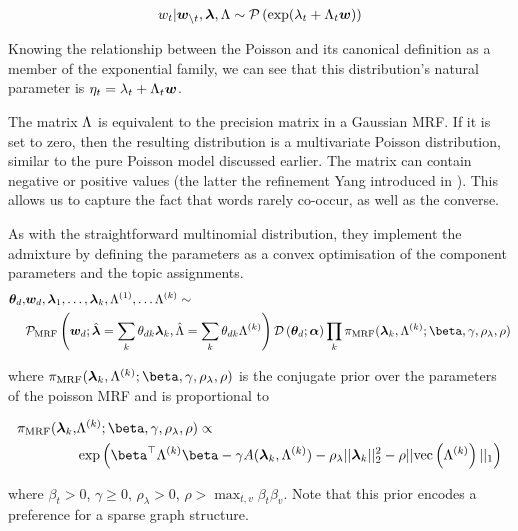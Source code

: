 \begin{align}
w_t | \bm w_{\setminus t}, \bm \lambda, \Lambda  \sim \mathcal{P} \left( {\exp(\lambda_t + \Lambda_t \bm w)} \right)
\end{align}

Knowing the relationship between the Poisson and its canonical definition as a member of the exponential family, we can see that this distribution's natural parameter is $\eta_t = \lambda_t + \Lambda_t \bm w$. 

The matrix $\Lambda$ is equivalent to the precision matrix in a Gaussian MRF. If it is set to zero, then the resulting distribution is a multivariate Poisson distribution, similar to the pure Poisson model discussed earlier. The matrix can contain negative or positive values (the latter the refinement Yang introduced in \cite{Yang2013a}). This allows us to capture the fact that words rarely co-occur, as well as the converse.

As with the straightforward multinomial distribution, they implement the admixture by defining the parameters as a convex optimisation of the component parameters and the topic assignments.
\begin{align} 
\begin{split}
\thd, &\wdoc, \vl_1, \ldots, \vl_k, \bl^{(1)}, \ldots \blk  \sim \\
& \mathcal{P}_{\text{MRF}}\left(\wdoc;  \hat{\vl} = \sum_k \thdk \vl_k, \hat{\bl} = \sum_k \thdk \blk \right)\dir{\thd; \vv{\alpha}}\prod_k \pi_{\text{MRF}}(\vl_k, \blk; \vv{\beta}, \gamma, \rho_\lambda, \rho)
\end{split}
\end{align}

where $\pi_{\text{MRF}}(\vl_k, \blk; \vv{\beta}, \gamma, \rho_\lambda, \rho)$ is the conjugate prior over the parameters of the poisson MRF and is proportional to

\begin{align}
\begin{split}
\pi_{\text{MRF}}(\vl_k, &\blk; \vv{\beta}, \gamma, \rho_\lambda, \rho) \propto \\
& \exp\left( \vv{\beta}\T\blk\vv{\beta} - \gamma A(\vl_k, \blk) - \rho_\lambda||\vl_k||_2^2 - \rho||\vecf{\blk}||_1 \right)
\end{split}
\end{align}

where $\beta_t > 0$, $\gamma \geq 0$, $\rho_\lambda > 0$, $\rho > \max_{t,v}\beta_t\beta_v$. Note that this prior encodes a preference for a sparse graph structure.

